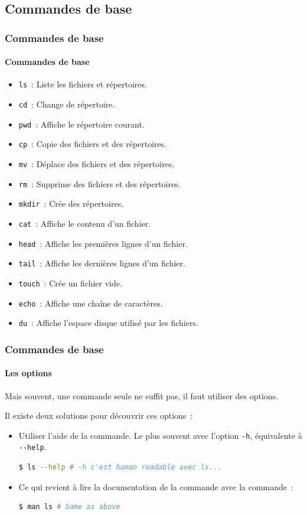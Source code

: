 \documentclass{beamer}
\begin{document}
    \subsection{Commandes de base}\label{subsec:commandes-de-base}

    \begin{frame}
        \transdissolve
        \frametitle{Commandes de base}
        \framesubtitle{Commandes de base}
        \begin{itemize}
            \item \lstinline{ls}~: Liste les fichiers et répertoires.
            \item \lstinline{cd}~: Change de répertoire.
            \item \lstinline{pwd}~: Affiche le répertoire courant.
            \item \lstinline{cp}~: Copie des fichiers et des répertoires.
            \item \lstinline{mv}~: Déplace des fichiers et des répertoires.
            \item \lstinline{rm}~: Supprime des fichiers et des répertoires.
            \item \lstinline{mkdir}~: Crée des répertoires.
            \item \lstinline{cat}~: Affiche le contenu d'un fichier.
            \item \lstinline{head}~: Affiche les premières lignes d'un fichier.
            \item \lstinline{tail}~: Affiche les dernières lignes d'un fichier.
            \item \lstinline{touch}~: Crée un fichier vide.
            \item \lstinline{echo}~: Affiche une chaîne de caractères.
            \item \lstinline{du}~: Affiche l'espace disque utilisé par les fichiers.
        \end{itemize}
    \end{frame}

    \begin{frame}[fragile]
        \transdissolve
        \frametitle{Commandes de base}
        \framesubtitle{Les options}
        Mais souvent, une commande seule ne suffit pas, il faut utiliser des options.

        Il existe deux solutions pour découvrir ces options~:
        \begin{itemize}
            \item Utiliser l'aide de la commande.
            Le plus souvent avec l'option \lstinline{-h}, équivalente à \lstinline{--help}.
            \begin{lstlisting}[language=bash]
$ ls --help # -h c'est human readable avec ls...
            \end{lstlisting}
            \item Ce qui revient à lire la documentation de la commande avec la commande~:
            \begin{lstlisting}[language=bash]
$ man ls # Same as above
            \end{lstlisting}
        \end{itemize}
    \end{frame}
\end{document}
